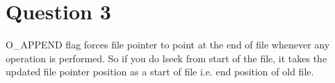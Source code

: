 \documentclass[main.tex]{subfiles}
\begin{document}
\section{Question 3}

O_APPEND flag forces file pointer to point at the end of file whenever any operation is performed.
So if you do lseek from start of the file, it takes the updated file pointer position as a start of file i.e. end position of old file.


\end{document}

